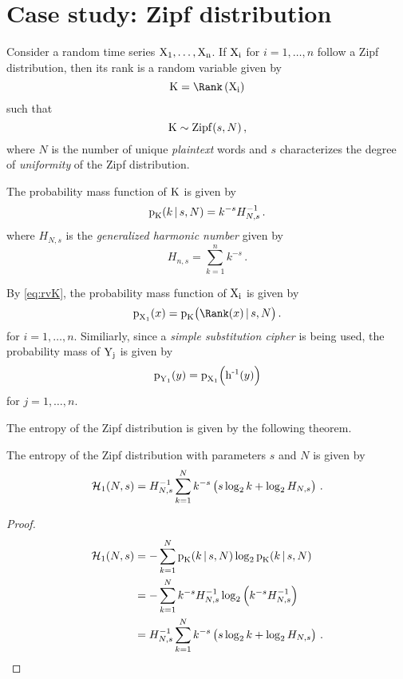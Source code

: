 \documentclass[ ../main.tex]{subfiles}
\newcommand{\harmonic}[2]{H_{#1,#2}}
\newcommand{\zipf}{\operatorname{\rm{Zipf}}}
\begin{document}
\section{Case study: Zipf distribution}
\label{sec:casestudy}
Consider a random time series $\mathrm{X_1},\ldots,\mathrm{X_n}$. If $\mathrm{X_i}$ for $i=1,\ldots,n$ follow a Zipf distribution, then its rank is a random variable given by
\begin{equation}
\label{eq:rvK}
    \rv{K} = \Rank\left(\rv{X_i}\right)
\end{equation}
such that
\begin{equation}
    \rv{K} \sim \zipf(s,N)\,,
\end{equation}
where $N$ is the number of unique \emph{plaintext} words and $s$ characterizes the degree of \emph{uniformity} of the Zipf distribution.

\begin{definition}
The probability mass function of $\mathrm{K}$ is given by
\begin{equation}
    \pmf_{\rv{K}}(k \given s, N) = k^{-s} \harmonic{N}{s}^{-1}\,.
\end{equation}
where $\harmonic{N}{s}$ is the \emph{generalized harmonic number} given by
\begin{equation}
    \harmonic{n}{s} = \sum_{k=1}^{n} k^{-s}\,.
\end{equation}
\end{definition}
By \cref{eq:rvK}, the probability mass function of $\mathrm{X_i}$ is given by
\begin{equation}
    \pmf_{\rv{X_1}}(x) = \pmf_{\rv{K}}\bigl(\Rank(x) \given s, N\bigr)\,.
\end{equation}
for $i=1,\ldots,n$. Similiarly, since a \emph{simple substitution cipher} is being used, the probability mass of $\mathrm{Y_j}$ is given by
\begin{equation}
    \operatorname{p}_{\mathrm{Y_1}}(y) = \operatorname{p}_{\mathrm{X_1}}\!\left(\operatorname{h^{-1}}(y)\right)
\end{equation}
for $j=1,\ldots,n$.

The entropy of the Zipf distribution is given by the following theorem.
\begin{theorem}
The entropy of the Zipf distribution with parameters $s$ and $N$ is given by
\begin{equation}
    \entropy_1(N,s) = \harmonic{N}{s}^{-1} \sum_{k=1}^{N} k^{-s}
            \left(s \log_2 k + \log_2 \harmonic{N}{s}\right)\,.
\end{equation}
\end{theorem}
\begin{proof}
\begin{align}
    \entropy_1(N,s) &= -\sum_{k=1}^{N} \pmf_{\rv{K}}(k \given s, N) \log_2 \pmf_{\rv{K}}(k \given s, N)\\
      &= -\sum_{k=1}^{N} k^{-s} \harmonic{N}{s}^{-1}
            \log_2 \left(k^{-s} \harmonic{N}{s}^{-1}\right)\\
      &= \harmonic{N}{s}^{-1} \sum_{k=1}^{N} k^{-s}
            \left(s \log_2 k + \log_2 \harmonic{N}{s}\right)\,.
\end{align}
\end{proof}
\end{document}
